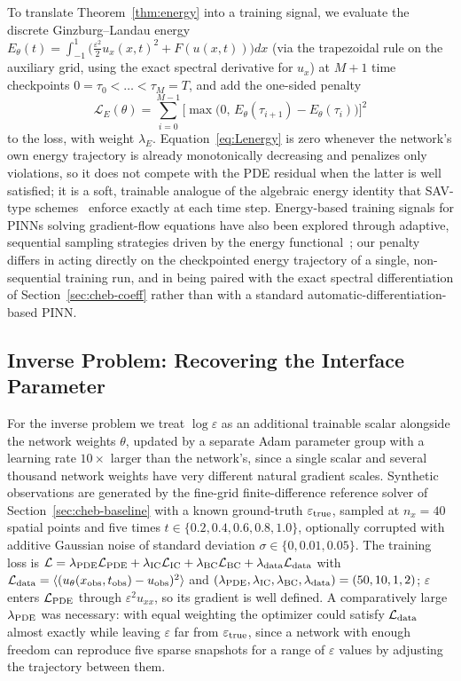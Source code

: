 \documentclass[symmetry,article,submit,moreauthors]{Definitions/mdpi}
\begin{document}
To translate Theorem~\ref{thm:energy} into a training signal, we evaluate the discrete Ginzburg--Landau energy $E_\theta(t)=\int_{-1}^1\big(\frac{\varepsilon^2}2 u_x(x,t)^2+F(u(x,t))\big)dx$ (via the trapezoidal rule on the auxiliary grid, using the exact spectral derivative for $u_x$) at $M+1$ time checkpoints $0=\tau_0<\dots<\tau_M=T$, and add the one-sided penalty
\begin{equation}\label{eq:Lenergy}
\mathcal L_E(\theta)=\sum_{i=0}^{M-1}\big[\max\big(0,\,E_\theta(\tau_{i+1})-E_\theta(\tau_i)\big)\big]^2
\end{equation}
to the loss, with weight $\lambda_E$. Equation~\eqref{eq:Lenergy} is zero whenever the network's own energy trajectory is already monotonically decreasing and penalizes only violations, so it does not compete with the PDE residual when the latter is well satisfied; it is a soft, trainable analogue of the algebraic energy identity that SAV-type schemes~\cite{Shen_SAV} enforce exactly at each time step. Energy-based training signals for PINNs solving gradient-flow equations have also been explored through adaptive, sequential sampling strategies driven by the energy functional~\cite{Guo_EnergySeq2024}; our penalty differs in acting directly on the checkpointed energy trajectory of a single, non-sequential training run, and in being paired with the exact spectral differentiation of Section~\ref{sec:cheb-coeff} rather than with a standard automatic-differentiation-based PINN.

\subsection{Inverse Problem: Recovering the Interface Parameter}

For the inverse problem we treat $\log\varepsilon$ as an additional trainable scalar alongside the network weights $\theta$, updated by a separate Adam parameter group with a learning rate $10\times$ larger than the network's, since a single scalar and several thousand network weights have very different natural gradient scales. Synthetic observations are generated by the fine-grid finite-difference reference solver of Section~\ref{sec:cheb-baseline} with a known ground-truth $\varepsilon_{\rm true}$, sampled at $n_x=40$ spatial points and five times $t\in\{0.2,0.4,0.6,0.8,1.0\}$, optionally corrupted with additive Gaussian noise of standard deviation $\sigma\in\{0,0.01,0.05\}$. The training loss is $\mathcal L=\lambda_{\rm PDE}\mathcal L_{\rm PDE}+\lambda_{\rm IC}\mathcal L_{\rm IC}+\lambda_{\rm BC}\mathcal L_{\rm BC}+\lambda_{\rm data}\mathcal L_{\rm data}$ with $\mathcal L_{\rm data}=\langle(u_\theta(x_{\rm obs},t_{\rm obs})-u_{\rm obs})^2\rangle$ and $(\lambda_{\rm PDE},\lambda_{\rm IC},\lambda_{\rm BC},\lambda_{\rm data})=(50,10,1,2)$; $\varepsilon$ enters $\mathcal L_{\rm PDE}$ through $\varepsilon^2u_{xx}$, so its gradient is well defined. A comparatively large $\lambda_{\rm PDE}$ was necessary: with equal weighting the optimizer could satisfy $\mathcal L_{\rm data}$ almost exactly while leaving $\varepsilon$ far from $\varepsilon_{\rm true}$, since a network with enough freedom can reproduce five sparse snapshots for a range of $\varepsilon$ values by adjusting the trajectory between them.
\end{document}
